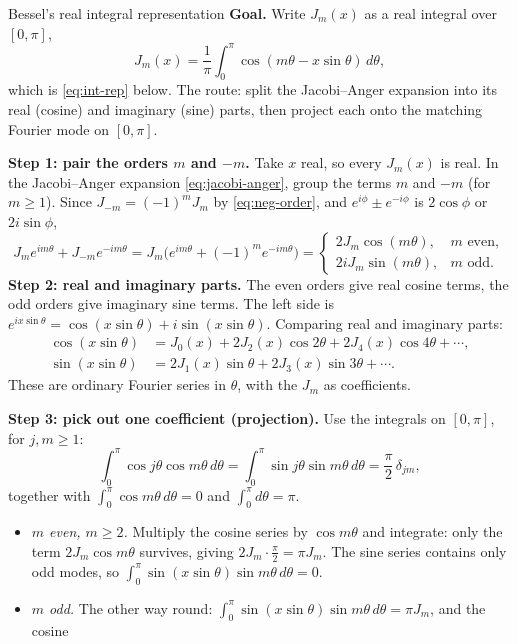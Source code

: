 \documentclass[11pt]{beamer}
\begin{document}
\begin{frame}[allowframebreaks=1.00]{Bessel's real integral representation}
\footnotesize
\textbf{Goal.} Write $J_m(x)$ as a real integral over $[0,\pi]$,
\[
 J_m(x)=\frac1\pi\int_0^\pi\cos(m\theta-x\sin\theta)\,d\theta,
\]
which is \eqref{eq:int-rep} below. The route: split the Jacobi--Anger expansion into its real
(cosine) and imaginary (sine) parts, then project each onto the matching Fourier mode on $[0,\pi]$.

\textbf{Step 1: pair the orders \(m\) and \(-m\).} Take \(x\) real, so every \(J_m(x)\) is real. In the
Jacobi--Anger expansion \eqref{eq:jacobi-anger}, group the terms \(m\) and \(-m\) (for \(m\ge1\)). Since
\(J_{-m}=(-1)^mJ_m\) by \eqref{eq:neg-order}, and \(e^{i\phi}\pm e^{-i\phi}\) is \(2\cos\phi\) or \(2i\sin\phi\),
\[
 J_me^{im\theta}+J_{-m}e^{-im\theta}
 =J_m\bigl(e^{im\theta}+(-1)^me^{-im\theta}\bigr)
 =\begin{cases}2J_m\cos(m\theta),&m\text{ even},\\
 2iJ_m\sin(m\theta),&m\text{ odd}.\end{cases}
\]
\textbf{Step 2: real and imaginary parts.} The even orders give real cosine terms, the odd orders give
imaginary sine terms. The left side is \(e^{ix\sin\theta}=\cos(x\sin\theta)+i\sin(x\sin\theta)\). Comparing real
and imaginary parts:
\begin{align*}
 \cos(x\sin\theta)
 &=J_0(x)+2J_2(x)\cos2\theta+2J_4(x)\cos4\theta+\cdots,\\
 \sin(x\sin\theta)
 &=2J_1(x)\sin\theta+2J_3(x)\sin3\theta+\cdots .
\end{align*}
These are ordinary Fourier series in \(\theta\), with the \(J_m\) as coefficients.
\par\framebreak\par
\textbf{Step 3: pick out one coefficient (projection).} Use the integrals on \([0,\pi]\), for
\(j,m\ge1\):
\[
 \int_0^\pi\cos j\theta\cos m\theta\,d\theta=\int_0^\pi\sin j\theta\sin m\theta\,d\theta=\frac\pi2\,\delta_{jm},
\]
together with \(\int_0^\pi\cos m\theta\,d\theta=0\) and \(\int_0^\pi d\theta=\pi\).
\begin{itemize}
  \item \emph{\(m\) even, \(m\ge2\).} Multiply the cosine series by \(\cos m\theta\) and integrate: only the term
        \(2J_m\cos m\theta\) survives, giving \(2J_m\cdot\frac\pi2=\pi J_m\). The sine series contains only odd
        modes, so \(\int_0^\pi\sin(x\sin\theta)\sin m\theta\,d\theta=0\).
  \item \emph{\(m\) odd.} The other way round: \(\int_0^\pi\sin(x\sin\theta)\sin m\theta\,d\theta=\pi J_m\), and the cosine

\end{itemize}
\end{frame}
\end{document}
